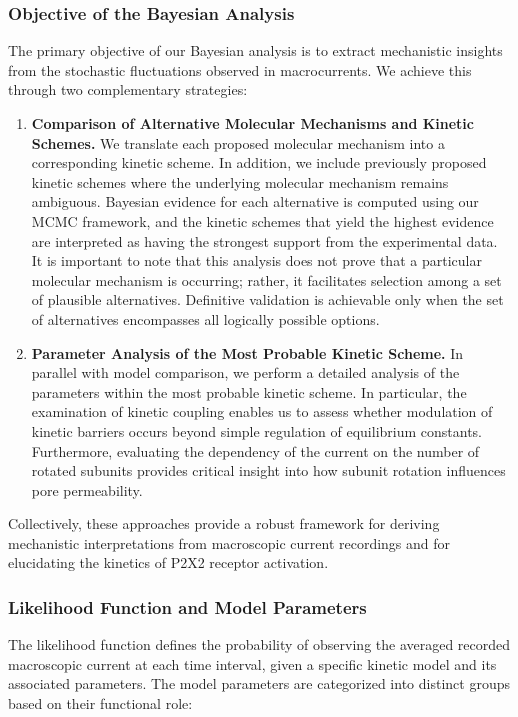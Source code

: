\documentclass[pdflatex,sn-nature]{sn-jnl}%
\begin{document}
\subsubsection{Objective of the Bayesian Analysis}
The primary objective of our Bayesian analysis is to extract mechanistic insights from the stochastic fluctuations observed in macrocurrents. We achieve this through two complementary strategies:

\begin{enumerate}[label=\textbf{\arabic*.}]
    \item \textbf{Comparison of Alternative Molecular Mechanisms and Kinetic Schemes.}  
    We translate each proposed molecular mechanism into a corresponding kinetic scheme. In addition, we include previously proposed kinetic schemes where the underlying molecular mechanism remains ambiguous. Bayesian evidence for each alternative is computed using our MCMC framework, and the kinetic schemes that yield the highest evidence are interpreted as having the strongest support from the experimental data. It is important to note that this analysis does not prove that a particular molecular mechanism is occurring; rather, it facilitates selection among a set of plausible alternatives. Definitive validation is achievable only when the set of alternatives encompasses all logically possible options.
    
    \item \textbf{Parameter Analysis of the Most Probable Kinetic Scheme.}  
    In parallel with model comparison, we perform a detailed analysis of the parameters within the most probable kinetic scheme. In particular, the examination of kinetic coupling enables us to assess whether modulation of kinetic barriers occurs beyond simple regulation of equilibrium constants. Furthermore, evaluating the dependency of the current on the number of rotated subunits provides critical insight into how subunit rotation influences pore permeability.
\end{enumerate}

Collectively, these approaches provide a robust framework for deriving mechanistic interpretations from macroscopic current recordings and for elucidating the kinetics of P2X2 receptor activation.

\subsubsection{Likelihood Function and Model Parameters}
The likelihood function defines the probability of observing the averaged recorded macroscopic current at each time interval, given a specific kinetic model and its associated parameters. The model parameters are categorized into distinct groups based on their functional role:
\end{document}
